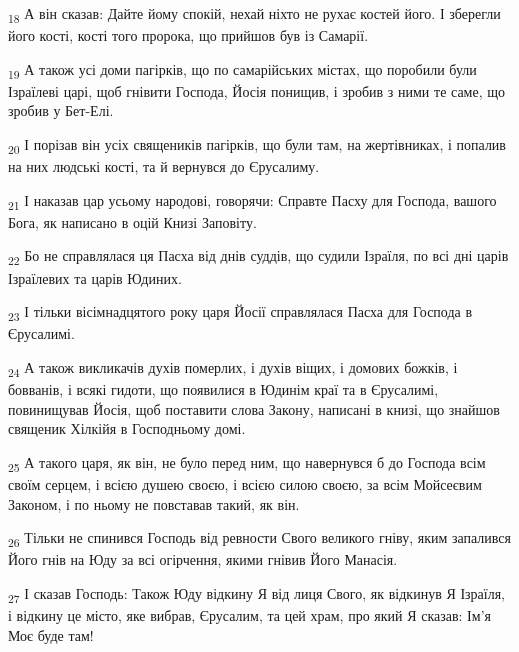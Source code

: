 \begin{tcolorbox}
\textsubscript{18} А він сказав: Дайте йому спокій, нехай ніхто не рухає костей його. І зберегли його кості, кості того пророка, що прийшов був із Самарії.
\end{tcolorbox}
\begin{tcolorbox}
\textsubscript{19} А також усі доми пагірків, що по самарійських містах, що поробили були Ізраїлеві царі, щоб гнівити Господа, Йосія понищив, і зробив з ними те саме, що зробив у Бет-Елі.
\end{tcolorbox}
\begin{tcolorbox}
\textsubscript{20} І порізав він усіх священиків пагірків, що були там, на жертівниках, і попалив на них людські кості, та й вернувся до Єрусалиму.
\end{tcolorbox}
\begin{tcolorbox}
\textsubscript{21} І наказав цар усьому народові, говорячи: Справте Пасху для Господа, вашого Бога, як написано в оцій Книзі Заповіту.
\end{tcolorbox}
\begin{tcolorbox}
\textsubscript{22} Бо не справлялася ця Пасха від днів суддів, що судили Ізраїля, по всі дні царів Ізраїлевих та царів Юдиних.
\end{tcolorbox}
\begin{tcolorbox}
\textsubscript{23} І тільки вісімнадцятого року царя Йосії справлялася Пасха для Господа в Єрусалимі.
\end{tcolorbox}
\begin{tcolorbox}
\textsubscript{24} А також викликачів духів померлих, і духів віщих, і домових божків, і бовванів, і всякі гидоти, що появилися в Юдинім краї та в Єрусалимі, повинищував Йосія, щоб поставити слова Закону, написані в книзі, що знайшов священик Хілкійя в Господньому домі.
\end{tcolorbox}
\begin{tcolorbox}
\textsubscript{25} А такого царя, як він, не було перед ним, що навернувся б до Господа всім своїм серцем, і всією душею своєю, і всією силою своєю, за всім Мойсеєвим Законом, і по ньому не повставав такий, як він.
\end{tcolorbox}
\begin{tcolorbox}
\textsubscript{26} Тільки не спинився Господь від ревности Свого великого гніву, яким запалився Його гнів на Юду за всі огірчення, якими гнівив Його Манасія.
\end{tcolorbox}
\begin{tcolorbox}
\textsubscript{27} І сказав Господь: Також Юду відкину Я від лиця Свого, як відкинув Я Ізраїля, і відкину це місто, яке вибрав, Єрусалим, та цей храм, про який Я сказав: Ім'я Моє буде там!
\end{tcolorbox}
